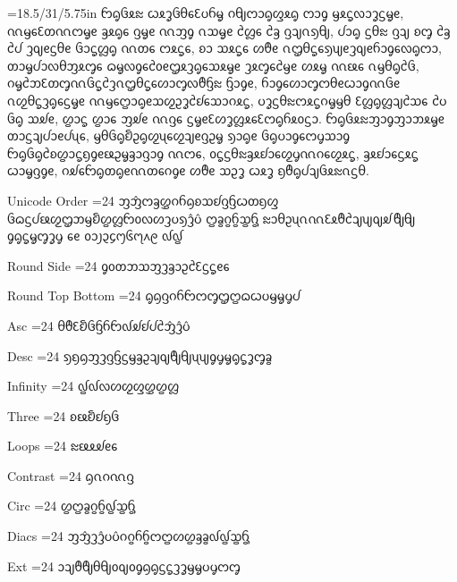 







\sizes={18.5/31/5.75in}
\dotext ᦝᧂᦑᦸᦰ ᦍᦸᧆᦑᦲᧈᦷᦢᦆᧄ ᦅᧀᦂᦱᧂᦐᦸᧂ ᦂᦱᧁ ᦙᦸᧃᦟᦱᧆᦓᧄᧉ, ᦶᦙᧈᦷᦎᦶᦂᧄᧉ ᦃᦸᧂᧈ ᦋᧄᧉ ᦶᦀᧁ ᦵᦉᧄᧉ ᦺᦜᧈ ᦺᦃ ᦋᦻᦵᦣᧀ, ᦔᦱᧂ ᦓᦲᦰ ᦋᦻ ᦈᧅ ᦺᦃ ᦺᦔ ᦡᦽᧉᦓᦲᧉ ᦑᦱᧃᦜᧂ ᦶᦎᧈ ᦂᦸᧃᧈ, ᦈᦱ ᦉᦸᧃᧈ ᦠᦹᧉ ᦵᦗᦲᧃᧈᦣᦼᧉᦡᦽᧉᦆᦱᧁᧈᦟᧂᦂᦱ, ᦎᦱᧄᦔᦱᦟᦲᦀᦸᧅᧈ ᦒᧄᦟᧁᧈᦺᦞᧉᦗᦸᦡᧂᧈᦉᦸᧄᧉ ᦡᦸᧅᧈᦺᦙᧉ ᦠᦸᧄ ᦶᦕᧈ ᦵᦙᦲᧂᦺᦑ, ᦅᧄᦺᦘᦷᦎᧅᦶᦑᧃᦺᦡᦵᦗᦲᧃᧈᦠᦱᧅᦟᦹᦌᦰ ᦌᦱᧁᧉ, ᦆᦱᧁᧈᦠᦱᧅᦂᦲᧉᦍᦱᧁᦶᦑᧉ ᦵᦖᦲᧃᦡᧂᧈᦓᧄᧉ ᦶᦙᧈᦦᦱᧂᧉᦉᦖᦳᧆᦺᦊᧈᦉᦱᦅᦸᧃ, ᦢᧆᦓᦲᦰᦂᦸᧃᦅᧄᦙᦲ ᦷᦜᧂᦜᦻᦺᦉᧈ ᦺᦢ ᦑᧂ ᦉᦾᧉ, ᦛᦱᧃ ᦛᦱᧈ ᦀᦾᧉ ᦶᦋᧈ ᦓᧄᧉᦷᦠᧆᦜᦸᧈᦷᦂᧂᦆᦸᦞᦓᦱ. ᦝᧂᦑᦸᦰᦀᦱᧁᦀᦱᦘᦸᧄᧉ ᦎᦱᦓᦻᦔᦱᧉᦔᦴᧈ, ᦙᦲᦑᧂᦚᦳᧂᦖᦴᧈᦖᦻᧉᦋᦳᧄ ᦣᦱᧂᧉ ᦑᧂᦢᦱᧁᧈᦂᧇᦉᦱᧁ ᦝᧂᦑᧂᦺᦈᦛᦱᧃᦏᧁᧉᦕᦳᧄᦃᦱᦋᦱᧁ ᦶᦂᧈ, ᦞᧃᦓᦲᦰᦃᦸᦊᦱᧈᦖᧇᦶᦅᧈᦖᦸᧃ, ᦃᦸᦊᦱᧈᦓᦸᧃ ᦍᦱᧄᦋᧁᧉ, ᦅᦾᧈᦝᧂᦎᧂᧉᦶᦎᧈᦅᧁᧉ ᦠᦹᧉ ᦉᦳᧆ ᦍᦸᧆ ᦏᦹᧂᦔᦻᦑᦸᦰᦵᦓᦲ.

\eject

\dotext Unicode Order
\sizes={24}
\dotext ᦀᦁᦂᦃᦄᦅᦆᦇᦈᦉᦊᦋᦌᦍᦎᦏᦐ
\dotext ᦑᦒᦓᦔᦕᦖᦗᦘᦙᦚᦛᦜᦝᦞᦟᦠᦡᦢᦣᦤᦥ
\dotext ᦦᦧᦨᦩᦪᦫ
\dotext ᦰᦱᦲᦳᦴᦵᦶᦷᦸᦹᦺᦻᦼᦽᦾᦿᧀ
\dotext ᧁᧂᧃᧄᧅᧆᧇ
\dotext ᧈᧉ
\dotext ᧐᧑᧒᧓᧔᧕᧖᧗᧘᧙
\dotext ᧞᧟

\dotext Round Side
\sizes={24}
\dotext ᧁᦞᦎᦘᦉᦀᦡᦃᦱᦳᦺᦷᦓᧃᧉᧈ

\dotext Round Top Bottom
\sizes={24}
\dotext ᧂᦇᦋᦅᦆᦝᦂᧅᦗᦦᦒᦍᦢᦙᧄᧇᦔ 

\dotext Asc
\sizes={24}
\dotext ᦲᦹᦷᦚᦑᦌᦆᦝ᧞ᦾᦊᦔᦺᦁᦤᦥ

\dotext Desc
\sizes={24}
\dotext ᦣᦏᦇᦀᦡᦋᦌᦓᦙᦃᦳᦻᦽᦿᧀᦴᦼᧁᧇᧄᧂᧃᧆᧅᦧ

\dotext Infinity
\sizes={24}
\dotext ᧟᧞ᦟᦠᦖᦐᦄᦛᦜ

\dotext Three
\sizes={24}
\dotext ᦈᦕᦚᦊᦏᦑ

\dotext Loops
\sizes={24}
\dotext ᦰᦕᦸᦾᧉᧈ

\dotext Contrast
\sizes={24}
\dotext ᦇᦵᦅᦶᦋ

\dotext Circ
\sizes={24}
\dotext ᦛᦦᦧᦨᦩ᧟ᦪᦫ

\dotext Diacs
\sizes={24}
\dotext ᦀᦁᦡᦤᦢᦥᦅᦨᦆᦩᦂᦦᦠᦛᦃᦧ᧞᧟ᦪᦫ

\dotext Ext
\sizes={24}
\dotext ᦱᦻᦹᦿᦲᧀᦞᦽᦞᧁᦇᧂᦓᧃᦡᧆᦙᧄᦢᧇᦂᧅ

